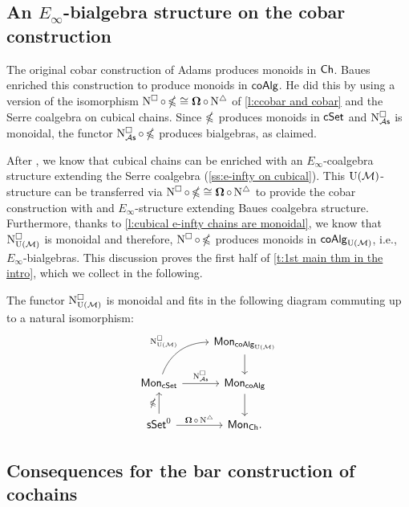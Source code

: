\subsection{An $E_{\infty}$-bialgebra structure on the cobar construction} \label{ss:e-infty on cobar}

The original cobar construction of Adams produces monoids in $\mathsf{Ch}$.
Baues enriched this construction to produce monoids in $\mathsf{coAlg}$.
He did this by using a version of the isomorphism $\operatorname{N^{\square}} \circ \operatorname{\mathbb{\Omega}} \cong \operatorname{\mathbf{\Omega}} \circ \operatorname{N^{\triangle}}$ of \cref{l:ccobar and cobar} and the Serre coalgebra on cubical chains.
Since $\operatorname{\mathbb{\Omega}}$ produces monoids in $\mathsf{cSet}$ and $\operatorname{N^{\square}_{{\mathcal{A}\mathsf{s}}}}$ is monoidal, the functor $\operatorname{N^{\square}_{{\mathcal{A}\mathsf{s}}}} \circ \operatorname{\mathbb{\Omega}}$ produces bialgebras, as claimed.

After \cite{medina2021cubical}, we know that cubical chains can be enriched with an $E_\infty$-coalgebra structure extending the Serre coalgebra (\cref{ss:e-infty on cubical}).
This ${\operatorname{U}(\mathcal{M})}$-structure can be transferred via $\operatorname{N^{\square}} \circ \operatorname{\mathbb{\Omega}} \cong \operatorname{\mathbf{\Omega}} \circ \operatorname{N^{\triangle}}$ to provide the cobar construction with and $E_\infty$-structure extending Baues coalgebra structure.
Furthermore, thanks to \cref{l:cubical e-infty chains are monoidal}, we know that $\operatorname{N^{\square}_{{\operatorname{U}(\mathcal{M})}}}$ is monoidal and therefore, $\operatorname{N^{\square}} \circ \operatorname{\mathbb{\Omega}}$ produces monoids in $\mathsf{coAlg}_{{\operatorname{U}(\mathcal{M})}}$, i.e., $E_\infty$-bialgebras.
This discussion proves the first half of \cref{t:1st main thm in the intro}, which we collect in the following.

\begin{lemma} \label{l:lift of cobar to e-infty}
	The functor $\operatorname{N^{\square}_{{\operatorname{U}(\mathcal{M})}}}$ is monoidal and fits in the following diagram commuting up to a natural isomorphism:
	\begin{equation*}
	\begin{tikzcd}
	& \Mon_{\coAlg_\UM} \arrow[d] \\
	\Mon_{\cSet} \arrow[ru, "\cchainsUM", out=70, in=180] \arrow[r, "\cchainsAS"]
	& \Mon_{\coAlg} \arrow[d] \\
	\sSet^0 \arrow[r, "\cobar \circ \schains"] \arrow[u, "\ccobar"]
	& \Mon_{\Ch}.
	\end{tikzcd}
	\end{equation*}	
\end{lemma}

\subsection{Consequences for the bar construction of cochains}

